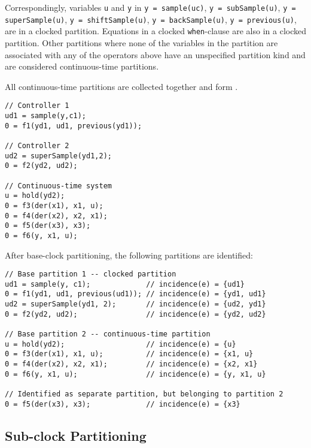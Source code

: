 Correspondingly, variables \lstinline!u! and \lstinline!y! in
\lstinline!y = sample(uc)!,
\lstinline!y = subSample(u)!,
\lstinline!y = superSample(u)!,
\lstinline!y = shiftSample(u)!,
\lstinline!y = backSample(u)!,
\lstinline!y = previous(u)!,
are in a clocked partition.
Equations in a clocked \lstinline!when!-clause are also in a clocked partition.
Other partitions where none of the variables in the partition are associated with any of the operators above have an unspecified partition kind and are considered continuous-time partitions.

All continuous-time partitions are collected together and form .

\begin{example}
\begin{lstlisting}[language=modelica]
// Controller 1
ud1 = sample(y,c1);
0 = f1(yd1, ud1, previous(yd1));

// Controller 2
ud2 = superSample(yd1,2);
0 = f2(yd2, ud2);

// Continuous-time system
u = hold(yd2);
0 = f3(der(x1), x1, u);
0 = f4(der(x2), x2, x1);
0 = f5(der(x3), x3);
0 = f6(y, x1, u);
\end{lstlisting}

After base-clock partitioning, the following partitions are identified:
\begin{lstlisting}[language=modelica]
// Base partition 1 -- clocked partition
ud1 = sample(y, c1);             // incidence(e) = {ud1}
0 = f1(yd1, ud1, previous(ud1)); // incidence(e) = {yd1, ud1}
ud2 = superSample(yd1, 2);       // incidence(e) = {ud2, yd1}
0 = f2(yd2, ud2);                // incidence(e) = {yd2, ud2}

// Base partition 2 -- continuous-time partition
u = hold(yd2);                   // incidence(e) = {u}
0 = f3(der(x1), x1, u);          // incidence(e) = {x1, u}
0 = f4(der(x2), x2, x1);         // incidence(e) = {x2, x1}
0 = f6(y, x1, u);                // incidence(e) = {y, x1, u}

// Identified as separate partition, but belonging to partition 2
0 = f5(der(x3), x3);             // incidence(e) = {x3}
\end{lstlisting}
\end{example}

\subsection{Sub-clock Partitioning}\label{sub-clock-partitioning}

